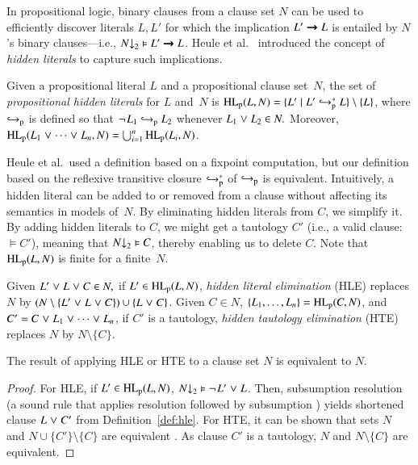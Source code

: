 In propositional logic, binary clauses from a clause set $N$ can be used to
efficiently discover literals $L, L'$ for which the implication $L' \impl L$
is entailed by $N$'s binary clauses---i.e., $\binset{N} \models L' \impl L$.
Heule et al.\ \cite{hjb-2011-big-simplification} introduced the concept of \emph{hidden
literals} to capture such implications.

\begin{defi}
   Given a propositional literal $L$ and a propositional clause set~$N$, the
   set of \emph{propositional hidden literals} for $L$ and~$N$ is
   $\PHL(L, N) = \{ L' \mid L' \bigpimpl{N}^\ast L \} \setminus \{ L \}$, where $\bigpimpl{N}$ is
   defined so that $\neglit{L_1} \bigpimpl{N} L_2$ whenever $L_1 \cor L_2 \in N.$
   Moreover, $\PHL(L_1 \cor \cdots \cor L_n, N) = \bigcup_{i=1}^n
   \PHL(L_i, N)$.
\end{defi}

Heule et al.\ used a definition based on a fixpoint computation, but our
definition based on the reflexive transitive closure $\bigpimpl{N}^\ast$ of $\bigpimpl{N}$ is equivalent. Intuitively,
a hidden literal can be added to or removed from a clause without affecting its
semantics in models of~$N.$ By eliminating hidden literals from $C$, we simplify
it. By adding hidden literals to $C$, we might get a tautology $C'$ (i.e., a
valid clause:\ $\models C'$), meaning that $\binset{N} \models C$, thereby
enabling us to delete $C$. Note that $\PHL(L,N)$ is finite for a finite~$N.$

\begin{defi}
   \label{def:hle}\label{def:hte}
   Given $L' \cor L \cor C \in N,$ if $L' \in
   \PHL(L, N)$, \emph{hidden literal elimination} (HLE) replaces $N$ by $(N
   \setminus \{L' \cor L \cor C\}) \cup \{L \cor C\}$.
   Given $C \in N$, $\{L_1,\dots,L_n\} = \PHL(C, N)$, and $C' = C \cor L_1 \cor
   \cdots \cor L_n$, if $C'$ is a tautology, \emph{hidden
   tautology elimination} (HTE) replaces $N$ by $N \setminus \{C\}$.
\end{defi}

\begin{theorem}
   The result of applying HLE or HTE to a clause set $N$ is
   equivalent to $N$.
\end{theorem}

\begin{proof}
For HLE, if $L' \in \PHL(L, N)$,  $\binset{N} \models \neglit{L'} \cor L$. Then,
subsumption resolution (a sound rule that applies resolution followed by
subsumption \cite{bg-01-resolution}) yields shortened clause $L \cor C'$ from
Definition~\ref{def:hle}. For HTE, it can be shown that sets $N$ and $N
\cup \{ C' \} \setminus \{C\}$ are equivalent
\cite[Sect.~2.1]{hjb-2011-big-simplification}. As clause $C'$ is a tautology,
$N$ and $N \setminus \{C\}$ are equivalent.\qedhere
\end{proof}

